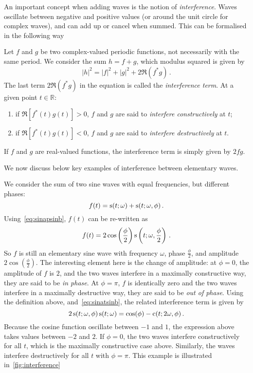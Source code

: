 An important concept when adding waves is the notion of \emph{interference}. Waves oscillate between negative and positive values (or around the unit circle for complex waves), and can add up or cancel when summed. This can be formalised in the following way
\begin{definition}
  Let $f$ and $g$ be two complex-valued periodic functions, not necessarily with the same period. We consider the sum $h=f+g$, which modulus squared is given by
  \begin{equation}
    |h|^2=|f|^2+|g|^2+2\Re(f^*g)\,.
  \end{equation}
  The last term $2\Re(f^*g)$ in the equation is called the \emph{interference term}. At a given point $t\in\mathbb{R}$:
  \begin{enumerate}
    \item if $\Re[f^*(t)g(t)]>0$, $f$ and $g$ are said to \emph{interfere constructively} at $t$;
    \item if $\Re[f^*(t)g(t)]<0$, $f$ and $g$ are said to \emph{interfere destructively} at $t$.
  \end{enumerate}
  If $f$ and $g$ are real-valued functions, the interference term is simply given by $2fg$.
\end{definition}
We now discuss below key examples of interference between elementary waves.
\begin{example}
  We consider the sum of two sine waves with equal frequencies, but different phases:
  \begin{equation}
    f(t)=\operatorname{s}(t;\omega)+\operatorname{s}(t;\omega,\phi)\,.
  \end{equation}
  Using~\cref{eq:sinapsinb}, $f(t)$ can be re-written as
  \begin{equation}
    f(t)=2\cos\left(\frac{\phi}{2}\right)\operatorname{s}\left(t;\omega,\frac{\phi}{2}\right)\,.
  \end{equation}
  So $f$ is still an elementary sine wave with frequency $\omega$, phase $\frac{\phi}{2}$, and amplitude $2\cos(\frac{\phi}{2})$. The interesting element here is the change of amplitude: at $\phi=0$, the amplitude of $f$ is $2$, and the two waves interfere in a maximally constructive way, they are said to be \emph{in phase}. At $\phi=\pi$, $f$ is identically zero and the two waves interfere in a maximally destructive way, they are said to be \emph{out of phase}.
  Using the definition above, and~\cref{eq:sinatsinb}, the related interference term is given by
  \begin{equation}
    2\operatorname{s}(t;\omega,\phi)\operatorname{s}(t;\omega)=\cos(\phi)-\operatorname{c}(t;2\omega,\phi)\,.
  \end{equation}
  Because the cosine function oscillate between $-1$ and $1$, the expression above takes values between $-2$ and $2$. If $\phi=0$, the two waves interfere constructively for all $t$, which is the maximally constructive case above. Similarly, the waves interfere destructively for all $t$ with $\phi=\pi$. This example is illustrated in~\cref{fig:interference}
\end{example}

